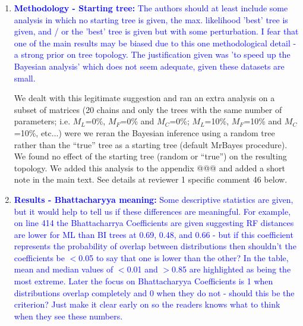 \documentclass[12pt,letterpaper]{article}
\begin{document}
\begin{enumerate}
\item{\textcolor{blue}{\textbf{Methodology - Starting tree:} The authors should at least include some analysis in which no starting tree is given, the max. likelihood 'best' tree is given, and / or the 'best' tree is given but with some perturbation.
I fear that one of the main results may be biased due to this one methodological detail - a strong prior on tree topology.
The justification given was 'to speed up the Bayesian analysis' which does not seem adequate, given these datasets are small.}}

We dealt with this legitimate suggestion and ran an extra analysis on a subset of matrices (20 chains and only the trees with the same number of parameters; i.e. $M_L$=0\%, $M_F$=0\% and $M_C$=0\%; $M_L$=10\%, $M_F$=10\% and $M_C$=10\%, etc...) were we reran the Bayesian inference using a random tree rather than the ``true'' tree as a starting tree (default MrBayes procedure).
We found no effect of the starting tree (random or ``true'') on the resulting topology.
We added this analysis to the appendix @@@ and added a short note in the main text.
See details at reviewer 1 specific comment 46 below.

\item{\textcolor{blue}{\textbf{Results - Bhattacharyya meaning:} Some descriptive statistics are given, but it would help to tell us if these differences are meaningful.
For example, on line 414 the Bhattacharrya Coefficients are given suggesting RF distances are lower for ML than BI trees at 0.69, 0.48, and 0.66 - but if this coefficient represents the probability of overlap between distributions then shouldn't the coefficients be $<$0.05 to say that one is lower than the other?
In the table, mean and median values of $<$0.01 and $>$0.85 are highlighted as being the most extreme.
Later the focus on Bhattacharyya Coefficients is 1 when distributions overlap completely and 0 when they do not - should this be the criterion?
Just make it clear early on so the readers knows what to think when they see these numbers. }}


\end{enumerate}
\end{document}
